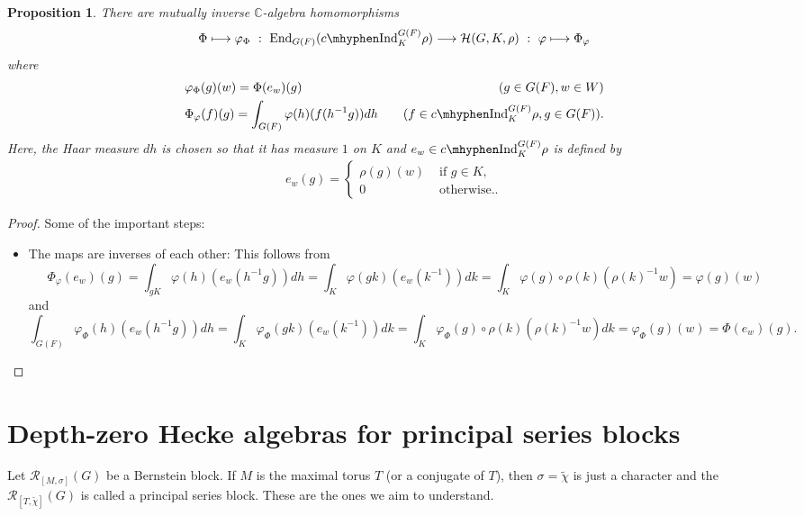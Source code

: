 \documentclass{article}
\newcommand{\End}{\mathrm{End}}
\newcommand{\cR}{\mathcal{R}}
\newcommand{\cH}{\mathcal{H}}
\newcommand{\CC}{\mathbb{C}}
\newcommand{\cInd}{c\mhyphen\mathrm{Ind}}
\theoremstyle{plain}
\newtheorem{proposition}[theorem]{Proposition}
\theoremstyle{definition}
\begin{document}
    \begin{proposition}
        There are mutually inverse $\CC$-algebra homomorphisms
        \begin{equation}
            \Phi\longmapsto \varphi_\Phi\ :\ \End_{G(F)}(\cInd_K^{G(F)}\rho)\longrightarrow\cH(G,K,\rho)\ :\ \varphi \longmapsto \Phi_\varphi
        \end{equation}
        where
        \begin{align*}
            &\varphi_\Phi(g)(w)=\Phi(e_w)(g)\quad & (g\in G(F), w\in W)\\
            &\Phi_\varphi(f)(g)=\int_{G(F)}\varphi(h)(f(h^{-1}g))dh \quad &(f\in\cInd_K^{G(F)}\rho, g\in G(F)).
        \end{align*}
        Here, the Haar measure $dh$ is chosen so that it has measure $1$ on $K$ and $e_w\in\cInd_K^{G(F)}\rho$ is defined by
        \begin{align*}
            e_w(g)=
            \begin{cases}
                \rho(g)(w) &\text{ if } g\in K,\\
                0 &\text{ otherwise.}.
            \end{cases}
        \end{align*}        
    \end{proposition}
    \begin{proof}
        Some of the important steps:
        \begin{itemize}
            \item The maps are inverses of each other: This follows from 
            $$\Phi_\varphi(e_w)(g)=\int_{gK}\varphi(h)(e_w(h^{-1}g))dh=\int_K\varphi(gk)(e_w(k^{-1}))dk=\int_K\varphi(g)\circ\rho(k)(\rho(k)^{-1}w)=\varphi(g)(w)$$
            and 
            $$\int_{G(F)}\varphi_\Phi(h)(e_w(h^{-1}g))dh=\int_{K}\varphi_\Phi(gk)(e_w(k^{-1}))dk=\int_{K}\varphi_\Phi(g)\circ\rho(k)(\rho(k)^{-1}w)dk=\varphi_\Phi(g)(w)=\Phi(e_w)(g).$$
        \end{itemize}
    \end{proof}

    \section{Depth-zero Hecke algebras for principal series blocks}
    Let $\cR_{[M,\sigma]}(G)$ be a Bernstein block. If $M$ is the maximal torus $T$ (or a conjugate of $T$), then $\sigma=\tilde\chi$ is just a character and the $\cR_{[T,\tilde\chi]}(G)$ is called a principal series block. These are the ones we aim to understand. 
\end{document}
